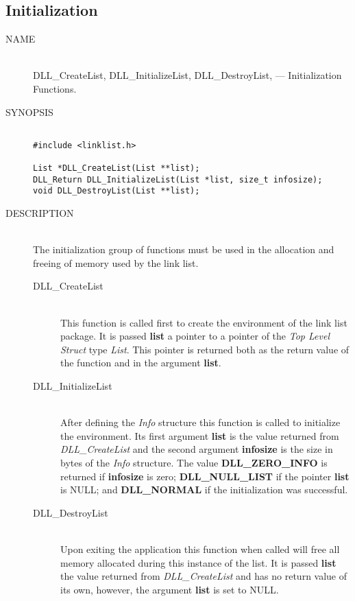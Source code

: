 \documentclass[10pt,letterpaper,titlepage]{article}
\begin{document}
\subsection{Initialization}
\begin{description}
\item[NAME]\quad\\
DLL\_CreateList, DLL\_InitializeList, DLL\_DestroyList, --- Initialization Functions.

\item[SYNOPSIS]
\begin{verbatim}

#include <linklist.h>

List *DLL_CreateList(List **list);
DLL_Return DLL_InitializeList(List *list, size_t infosize);
void DLL_DestroyList(List **list);
\end{verbatim}

\item[DESCRIPTION]\quad\\
The initialization group of functions must be used in the allocation and freeing of memory used by the link list.

 \begin{description}
 \item[DLL\_CreateList]\quad\\
 This function is called first to create the environment of the link list package.  It is passed \textbf{list} a pointer to a pointer of the \emph{Top Level Struct} type \emph{List}.  This pointer is returned both as the return value of the function and in the argument \textbf{list}.

 \item[DLL\_InitializeList]\quad\\
 After defining the \emph{Info} structure this function is called to initialize the environment.  Its first argument \textbf{list} is the value returned from \emph{DLL\_CreateList} and the second argument \textbf{infosize} is the size in bytes of the \emph{Info} structure.  The value \textbf{DLL\_ZERO\_INFO} is returned if \textbf{infosize} is zero; \textbf{DLL\_NULL\_LIST} if the pointer \textbf{list} is NULL; and \textbf{DLL\_NORMAL} if the initialization was successful.

 \item[DLL\_DestroyList]\quad\\
 Upon exiting the application this function when called will free all memory allocated during this instance of the list.  It is passed \textbf{list} the value returned from \emph{DLL\_CreateList} and has no return value of its own, however, the argument \textbf{list} is set to NULL.
 \end{description}


\end{description}
\end{document}
